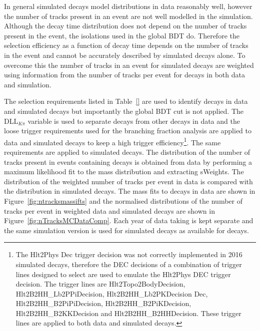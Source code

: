 In general simulated decays model distributions in data reasonably well, however the number of tracks present in an event are not well modelled in the simulation. %
Although the \bsmumu decay time distribution does not depend on the number of tracks present in the event, the isolations used in the global BDT do. Therefore the selection efficiency as a function of decay time depends on the number of tracks in the event and cannot be accurately described by simulated decays alone. To overcome this the number of tracks in an event for simulated \bsmumu decays are weighted using information from the number of tracks per event for \bdkpi decays in both data and simulation. 

The selection requirements listed in Table~\ref{} are used to identify \bdkpi decays in data and simulated decays but importantly the global BDT cut is not applied. The DLL$_{K\pi}$ variable is used to separate \bdkpi decays from other \bhh decays in data and the loose trigger requirements used for the branching fraction analysis are applied to data and simulated decays to keep a high trigger efficiency\footnote{The Hlt2Phys Dec trigger decision was not correctly implemented in 2016 simulated decays, therefore the DEC decisions of a combination of trigger lines designed to select \bhh are used to emulate the Hlt2Phys DEC trigger decision. The trigger lines are Hlt2Topo2BodyDecision, Hlt2B2HH\_Lb2PPiDecision, Hlt2B2HH\_Lb2PKDecision Dec, Hlt2B2HH\_B2PiPiDecision, Hlt2B2HH\_B2PiKDecision, Hlt2B2HH\_B2KKDecision and Hlt2B2HH\_B2HHDecision. These trigger lines are applied to both data and simulated decays.}. The same requirements are applied to simulated decays. The distribution of the number of tracks present in events containing \bdkpi decays is obtained from data by performing a maximum likelihood fit to the \bd mass distribution and extracting sWeights. The distribution of the weighted number of tracks per event in data is compared with the distribution in simulated \bdkpi decays. The mass fits to \bdkpi decays in data are shown in Figure~\ref{fig:ntracksmassifts} and the normalised distributions of the number of tracks per event in weighted data and simulated decays are shown in Figure~\ref{fig:nTracksMCDataComp}. Each year of data taking is kept separate and the same simulation version is used for \bdkpi simulated decays as available for \bsmumu decays.



